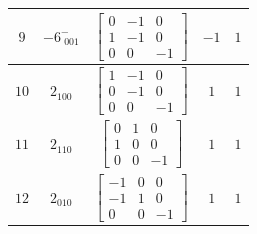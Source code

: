 \documentclass[fleqn,8pt]{jsarticle}
\begin{document}
\begin{longtable}{ccccc}
$ 9 $ & $ -6^{-}_{\,\,001} $ & $ \begin{bmatrix} 0 & -1 & 0 \\ 1 & -1 & 0 \\ 0 & 0 & -1 \end{bmatrix} $ & $ -1 $ & $ 1 $ \\ \hline
$ 10 $ & $ 2{}_{100} $ & $ \begin{bmatrix} 1 & -1 & 0 \\ 0 & -1 & 0 \\ 0 & 0 & -1 \end{bmatrix} $ & $ 1 $ & $ 1 $ \\ \hline
$ 11 $ & $ 2{}_{110} $ & $ \begin{bmatrix} 0 & 1 & 0 \\ 1 & 0 & 0 \\ 0 & 0 & -1 \end{bmatrix} $ & $ 1 $ & $ 1 $ \\ \hline
$ 12 $ & $ 2{}_{010} $ & $ \begin{bmatrix} -1 & 0 & 0 \\ -1 & 1 & 0 \\ 0 & 0 & -1 \end{bmatrix} $ & $ 1 $ & $ 1 $ \\
\end{longtable}
\end{document}
